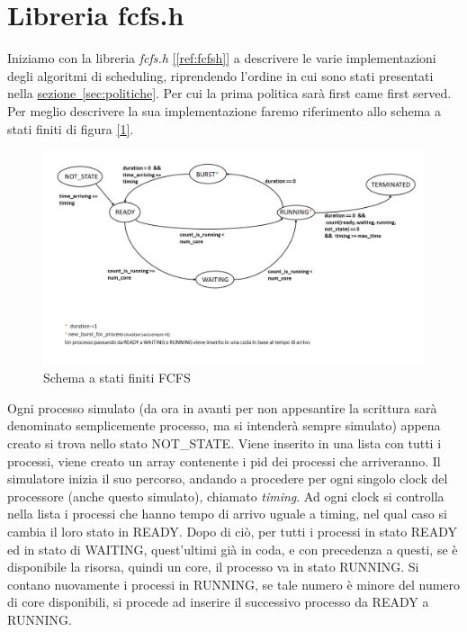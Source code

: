 \documentclass[Lau, oneside]{sapthesis}%
\begin{document}
\section{Libreria fcfs.h}
\label{sec:fcfs.h}
Iniziamo con la libreria \textit{fcfs.h} \hyperref[ref:fcfsh]{[\ref*{ref:fcfsh}]} a descrivere le varie implementazioni degli algoritmi di scheduling, riprendendo l'ordine in cui sono stati presentati nella \hyperref[sec:politiche]{sezione~\ref*{sec:politiche}}.
Per cui la prima politica sarà first came first served.
Per meglio descrivere la sua implementazione faremo riferimento allo schema a stati finiti di figura \hyperref[figura:fcfs]{[\ref*{figura:fcfs}]}.
\begin{figure}[ht!]
  \centering
  \includegraphics[width=1\textwidth]{schema a stati finiti FCFS.JPG}
  \caption{Schema a stati finiti FCFS}
  \label{figura:fcfs}
\end{figure}
Ogni processo simulato (da ora in avanti per non appesantire la scrittura sarà denominato semplicemente processo, ma si intenderà sempre simulato) appena creato si trova nello stato NOT\_STATE.
Viene inserito in una lista con tutti i processi, viene creato un array contenente i pid dei processi che arriveranno.
Il simulatore inizia il suo percorso, andando a procedere per ogni singolo clock del processore (anche questo simulato), chiamato \textit{timing}.
Ad ogni clock si controlla nella lista i processi che hanno tempo di arrivo uguale a timing, nel qual caso si cambia il loro stato in READY.
Dopo di ciò, per tutti i processi in stato READY ed in stato di WAITING, quest'ultimi già in coda, e con precedenza a questi, se è disponibile la risorsa, quindi un core, il processo va in stato RUNNING.
Si contano nuovamente i processi in RUNNING, se tale numero è minore del numero di core disponibili, si procede ad inserire il successivo processo da READY a RUNNING.
\end{document}
